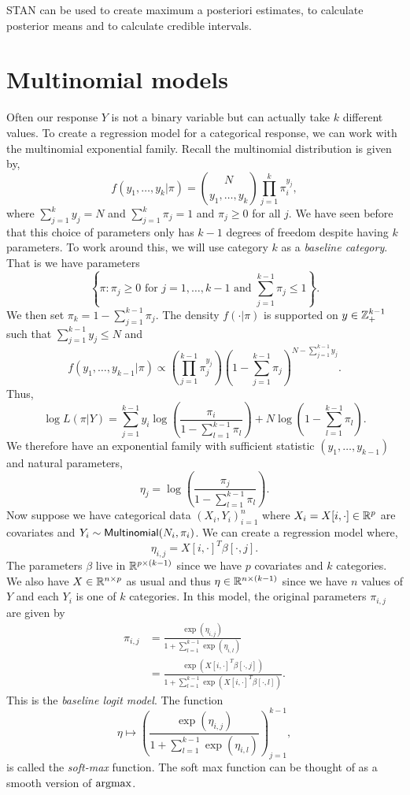 STAN can be used to create maximum a posteriori estimates, to calculate posterior means and to calculate credible intervals.

\section{Multinomial models}
Often our response $Y$ is not a binary variable but can actually take $k$ different values. To create a regression model for a categorical response, we can work with the multinomial exponential family. Recall the multinomial distribution is given by,
\[f(y_1,\ldots,y_k|\pi) = \binom{N}{y_1,\ldots,y_k} \prod_{j=1}^k \pi_i^{y_j}, \]
where $\sum_{j=1}^k y_j = N$ and $\sum_{j=1}^k \pi_j =1$ and $\pi_j \ge 0$ for all $j$. We have seen before that this choice of parameters only has $k-1$ degrees of freedom despite having $k$ parameters. To work around this, we will use category $k$ as a \emph{baseline category}. That is we have parameters 
\[\left\{\pi: \pi_j \ge 0 \text{ for } j=1,\ldots,k-1 \text{ and } \sum_{j=1}^{k-1}\pi_j \le 1 \right\}.\] 
We then set $\pi_k = 1-\sum_{j=1}^{k-1}\pi_j$. The density $f(\cdot|\pi)$ is supported on $y \in {{\mathbb Z}}_+^{k-1}$ such that $\sum_{j=1}^{k-1} y_j \le N$ and
\[f(y_1,\ldots, y_{k-1}|\pi) \propto \left(\prod_{j=1}^{k-1} \pi_j^{y_j}\right)\left(1-\sum_{j=1}^{k-1}\pi_j\right)^{N - \sum_{j=1}^{k-1}y_j}. \]
Thus,
\[\log L(\pi|Y) = \sum_{j=1}^{k-1} y_i \log\left(\frac{\pi_i}{1-\sum_{l=1}^{k-1}\pi_l}\right) +N\log\left(1-\sum_{l=1}^{k-1}\pi_l\right).\]
We therefore have an exponential family with sufficient statistic $(y_1,\ldots, y_{k-1})$ and natural parameters,
\[\eta_j = \log\left(\frac{\pi_j}{1-\sum_{l=1}^{k-1}\pi_l}\right). \]
Now suppose we have categorical data $(X_i,Y_i)_{i=1}^n$  where $X_i = X[i,\cdot]\in{\mathbb R}^p$ are covariates and $Y_i \sim \mathsf{Multinomial}(N_i,\pi_i)$. We can create a regression model where,
\[\eta_{i,j} = X[i,\cdot]^T \beta[\cdot,j]. \]
The parameters $\beta$ live in ${\mathbb R}^{p \times (k-1)}$  since we have $p$ covariates and $k$ categories. We also have $X \in {\mathbb R}^{n \times p}$ as usual and thus $\eta \in {\mathbb R}^{n \times (k-1)}$ since we have $n$ values of $Y$ and each $Y_i$ is one of $k$ categories. In this model, the original parameters $\pi_{i,j}$ are given by
\begin{align*}
    \pi_{i,j} &= \frac{\exp(\eta_{i,j})}{1+\sum_{l=1}^{k-1}\exp(\eta_{i,l})}\\
    &=\frac{\exp(X[i,\cdot]^T \beta[\cdot,j])}{1+\sum_{l=1}^{k-1}\exp(X[i,\cdot]^T \beta[\cdot,l])}.
\end{align*}
This is the \emph{baseline logit model}. The function
\[ \eta \mapsto \left(\frac{\exp(\eta_{i,j})}{1+\sum_{l=1}^{k-1}\exp(\eta_{i,l})}\right)_{j=1}^{k-1},\]
is called the \emph{soft-max} function. The soft max function can be thought of as a smooth version of $\operatorname*{argmax}$.
